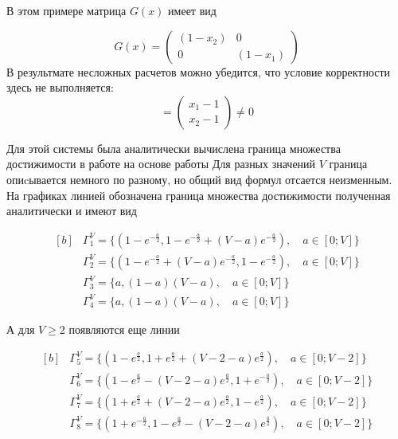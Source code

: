 В этом примере матрица $G(x)$ имеет вид 

\begin{equation*}
  G(x) = 
  \begin{pmatrix}
    (1-x_2) & 0 \\
    0 & (1-x_1)
  \end{pmatrix}
\end{equation*}
В результмате несложных расчетов можно убедится, что условие корректности здесь не выполняется:
\begin{equation*}
  [\varphi,\psi] = 
  \begin{pmatrix}
    x_1 - 1\\
    x_2 - 1
  \end{pmatrix}
  \neq 0
\end{equation*}


Для этой системы была аналитически вычислена граница множества
достижимости в работе на основе работы \cite{AVS2016} Для разных
значений $V$ граница опиcывается немного по разному, но общий вид
формул отсается неизменным. На графиках линией обозначена граница
множества достижимости полученная аналитически и имеют вид

\begin{equation*}
  \begin{aligned}[b]
    &\Gamma^V_1 = \{ (1 - e^{-\frac{a}{2}},1 -
    e^{-\frac{a}{2}}+(V-a)e^{-\frac{a}{2}}), \quad a\in[0;V] \}\\
    &\Gamma^V_2 = \{ (1 -
    e^{-\frac{a}{2}}+(V-a)e^{-\frac{a}{2}},1 - e^{-\frac{a}{2}}),\quad
    a\in[0;V] \}\\
    &\Gamma^V_3 = \{a,(1-a)(V-a), \quad a\in[0;V] \}\\
    &\Gamma^V_4 = \{a,(1-a)(V-a), \quad a\in[0;V] \}
  \end{aligned}
\end{equation*}

А для $V \ge 2$ появляются еще линии

\begin{equation*}
  \begin{aligned}[b]
    &\Gamma^V_5 = \{ (1 - e^{\frac{a}{2}},1 +
    e^{\frac{a}{2}}+(V-2-a)e^{\frac{a}{2}}), \quad a\in[0;V-2]  \}\\
    &\Gamma^V_6 = \{ (1 -
    e^{\frac{a}{2}}-(V-2-a)e^{\frac{a}{2}},1 + e^{-\frac{a}{2}}), \quad a\in[0;V-2] \}\\
    &\Gamma^V_7 = \{ (1 +
    e^{\frac{a}{2}}+(V-2-a)e^{\frac{a}{2}},1 - e^{\frac{a}{2}}), \quad a\in[0;V-2] \}\\
    &\Gamma^V_8 = \{ (1 + e^{-\frac{a}{2}},1 -
    e^{\frac{a}{2}}-(V-2-a)e^{\frac{a}{2}}), \quad a\in[0;V-2] \}\\
  \end{aligned}
\end{equation*}


